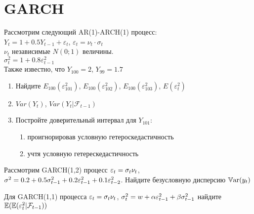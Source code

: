 

\chapter{GARCH}



\begin{problem}
Рассмотрим следующий AR(1)-ARCH(1) процесс: \\
$Y_{t}=1+0.5Y_{t-1}+\varepsilon_{t}$, $\varepsilon_{t}=\nu_{t}\cdot \sigma_{t}$ \\
$\nu_{t}$ независимые $N(0;1)$ величины. \\
$\sigma^{2}_{t}=1+0.8\varepsilon^{2}_{t-1}$\\
Также известно, что $Y_{100}=2$, $Y_{99}=1.7$
\begin{enumerate}
\item Найдите $E_{100}(\varepsilon^{2}_{101})$, $E_{100}(\varepsilon^{2}_{102})$, $E_{100}(\varepsilon^{2}_{103})$, $E(\varepsilon^{2}_{t})$
\item $Var(Y_{t})$, $Var(Y_{t}|\mathcal{F}_{t-1})$
\item Постройте доверительный интервал для $Y_{101}$:
\begin{enumerate}
\item проигнорировав условную гетероскедастичность
\item учтя условную гетерескедастичность
\end{enumerate}
\end{enumerate}
\begin{sol}
\end{sol}
\end{problem}




\begin{problem}
Рассмотрим GARCH(1,2) процесс $\varepsilon_t=\sigma_t \nu_t$, $\sigma^2=0.2+0.5\sigma^2_{t-1}+0.2\varepsilon_{t-1}^2+0.1\varepsilon_{t-2}^2$. Найдите безусловную дисперсию $\operatorname{\mathbb{V}\mathrm{ar}}(y_t)$
\begin{sol}

\end{sol}
\end{problem}


\begin{problem}
Для GARCH(1,1) процесса $\varepsilon_t=\sigma_t \nu_t$, $\sigma^2_{t}= w + \alpha \varepsilon_{t-1}^2+ \beta \sigma^2_{t-1}$ найдите $\operatorname{\mathbb{E}}( \operatorname{\mathbb{E}}(\varepsilon_t^2 | \mathcal{F}_{t-1} ) )$
\begin{sol}

\end{sol}
\end{problem}




